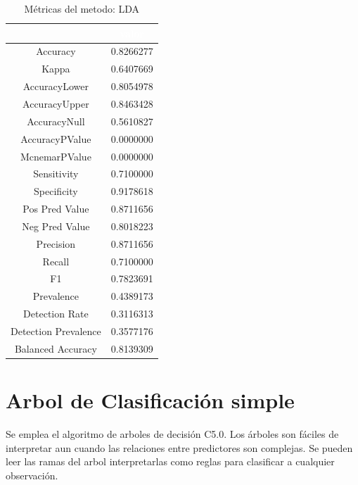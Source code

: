\documentclass[]{article}
\begin{document}
\begin{table}[!h]

\caption{\label{tab:metricas_LDA}Métricas del metodo: LDA }
\centering
\begin{tabular}[t]{cc}
\toprule
\rowcolor{black}  \multicolumn{1}{c}{\textcolor{white}{\textbf{metricas}}} & \multicolumn{1}{c}{\textcolor{white}{\textbf{valor}}}\\
\midrule
\rowcolor{gray!6}  Accuracy & 0.8266277\\
Kappa & 0.6407669\\
\rowcolor{gray!6}  AccuracyLower & 0.8054978\\
AccuracyUpper & 0.8463428\\
\rowcolor{gray!6}  AccuracyNull & 0.5610827\\
\addlinespace
AccuracyPValue & 0.0000000\\
\rowcolor{gray!6}  McnemarPValue & 0.0000000\\
Sensitivity & 0.7100000\\
\rowcolor{gray!6}  Specificity & 0.9178618\\
Pos Pred Value & 0.8711656\\
\addlinespace
\rowcolor{gray!6}  Neg Pred Value & 0.8018223\\
Precision & 0.8711656\\
\rowcolor{gray!6}  Recall & 0.7100000\\
F1 & 0.7823691\\
\rowcolor{gray!6}  Prevalence & 0.4389173\\
\addlinespace
Detection Rate & 0.3116313\\
\rowcolor{gray!6}  Detection Prevalence & 0.3577176\\
Balanced Accuracy & 0.8139309\\
\bottomrule
\end{tabular}
\end{table}

\hypertarget{arbol-de-clasificaciuxf3n-simple}{%
\section{Arbol de Clasificación
simple}\label{arbol-de-clasificaciuxf3n-simple}}

Se emplea el algoritmo de arboles de decisión C5.0. Los árboles son
fáciles de interpretar aun cuando las relaciones entre predictores son
complejas. Se pueden leer las ramas del arbol interpretarlas como reglas
para clasificar a cualquier observación.
\end{document}
